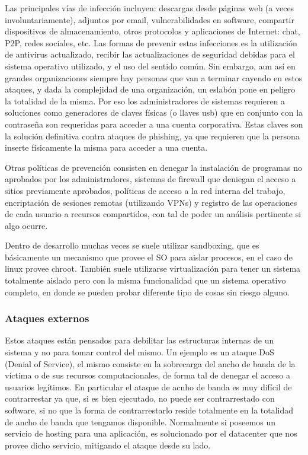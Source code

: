\documentclass{article}
\begin{document}
Las principales vías de infección incluyen: descargas desde páginas web (a veces involuntariamente), adjuntos por email, vulnerabilidades en software, compartir dispositivos de almacenamiento, otros protocolos y aplicaciones de Internet: chat, P2P, redes sociales, etc. Las formas de prevenir estas infecciones es la utilización de antivirus actualizado, recibir las actualizaciones de seguridad debidas para el sistema operativo utilizado, y el uso del sentido común. Sin embargo, aun así en grandes organizaciones siempre hay personas que van a terminar cayendo en estos ataques, y dada la complejidad de una organización, un eslabón pone en peligro la totalidad de la misma. Por eso los administradores de sistemas requieren a soluciones como generadores de claves físicas (o llaves usb) que en conjunto con la contraseña son requeridas para acceder a una cuenta corporativa. Estas claves son la solución definitiva contra ataques de phishing, ya que requieren que la persona inserte físicamente la misma para acceder a una cuenta.

Otras políticas de prevención consisten en denegar la instalación de programas no aprobados por los administradores, sistemas de firewall que deniegan el acceso a sitios previamente aprobados, políticas de acceso a la red interna del trabajo, encriptación de sesiones remotas (utilizando VPNs) y registro de las operaciones de cada usuario a recursos compartidos, con tal de poder un análisis pertinente si algo ocurre.

Dentro de desarrollo muchas veces se suele utilizar sandboxing, que es básicamente un mecanismo que provee el SO para aislar procesos, en el caso de linux provee chroot. También suele utilizarse virtualización para tener un sistema totalmente aislado pero con la misma funcionalidad que un sistema operativo completo, en donde se pueden probar diferente tipo de cosas sin riesgo alguno.

\subsubsection{Ataques externos}

Estos ataques están pensados para debilitar las estructuras internas de un sistema y no para tomar control del mismo. Un ejemplo es un ataque DoS (Denial of Service), el mismo consiste en la sobrecarga del ancho de banda de la víctima o de sus recursos computacionales, de forma tal de denegar el acceso a usuarios legítimos. En particular el ataque de acnho de banda es muy difícil de contrarrestar ya que, si es bien ejecutado, no puede ser contrarrestado con software, si no que la forma de contrarrestarlo reside totalmente en la totalidad de ancho de banda que tengamos disponible. Normalmente si poseemos un servicio de hosting para una aplicación, es solucionado por el datacenter que nos provee dicho servicio, mitigando el ataque desde su lado.
\end{document}
